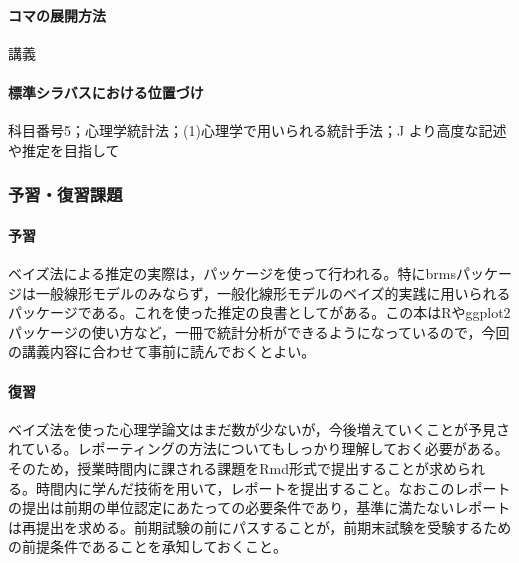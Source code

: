 \paragraph{コマの展開方法}
講義
\paragraph{標準シラバスにおける位置づけ}
科目番号5；心理学統計法；(1)心理学で用いられる統計手法；J より高度な記述や推定を目指して
\subsubsection{予習・復習課題}
\paragraph{予習}
ベイズ法による推定の実際は，パッケージを使って行われる。特にbrmsパッケージは一般線形モデルのみならず，一般化線形モデルのベイズ的実践に用いられるパッケージである。これを使った推定の良書として\citet{馬場201907}がある。この本はRやggplot2パッケージの使い方など，一冊で統計分析ができるようになっているので，今回の講義内容に合わせて事前に読んでおくとよい。
\paragraph{復習}
ベイズ法を使った心理学論文はまだ数が少ないが，今後増えていくことが予見されている。レポーティングの方法についてもしっかり理解しておく必要がある。そのため，授業時間内に課される課題をRmd形式で提出することが求められる。時間内に学んだ技術を用いて，レポートを提出すること。なおこのレポートの提出は前期の単位認定にあたっての必要条件であり，基準に満たないレポートは再提出を求める。前期試験の前にパスすることが，前期末試験を受験するための前提条件であることを承知しておくこと。

